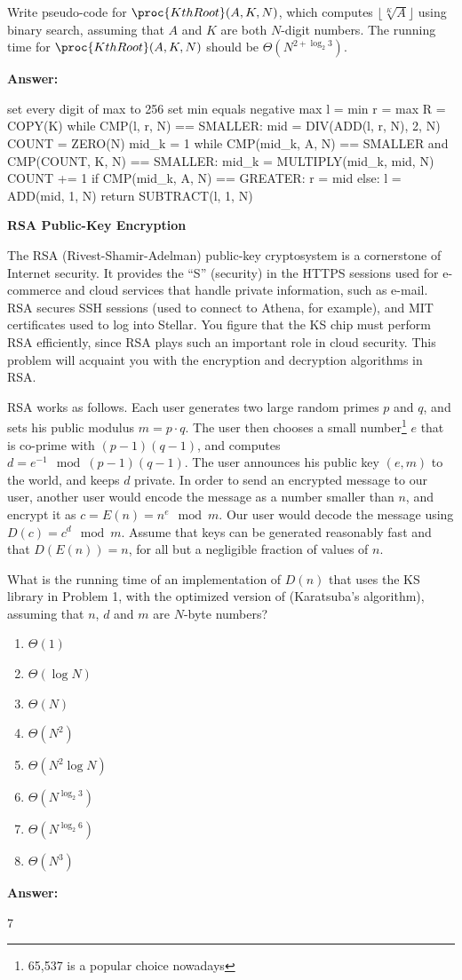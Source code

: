 \documentclass[12pt,twoside]{article}
\newcommand{\answer}{
 \par\medskip
 \textbf{Answer:}
}
\newcommand{\answerIp}{ \answer
set every digit of max to 256
set min equals negative max
l = min
r = max
R = COPY(K)
while CMP(l, r, N) == SMALLER:
  mid = DIV(ADD(l, r, N), 2, N)
  COUNT = ZERO(N)
  mid_k = 1
  while CMP(mid_k, A, N) == SMALLER and CMP(COUNT, K, N) == SMALLER:
    mid_k = MULTIPLY(mid_k, mid, N)
    COUNT += 1
  if CMP(mid_k, A, N) == GREATER:
    r = mid
  else:
    l = ADD(mid, 1, N)
return SUBTRACT(l, 1, N)
}
\newcommand{\answerIIa}{ \answer
7
}
\begin{document}
\begin{problems}
\begin{problemparts}
\problempart {} Write pseudo-code for $\proc{KthRoot}(A, K, N)$, which
computes $\lfloor \sqrt[K]{A} \rfloor$ using binary search, assuming that $A$
and $K$ are both $N$-digit numbers. The running time for $\proc{KthRoot}(A, K,
N)$ should be $\Theta(N^{2 + \log_2 3})$.

\answerIp

\end{problemparts}

\newpage

\problem {} \textbf{RSA Public-Key Encryption}

The RSA (Rivest-Shamir-Adelman) public-key cryptosystem is a cornerstone of
Internet security. It provides the ``S'' (security) in the HTTPS sessions used
for e-commerce and cloud services that handle private information, such as
e-mail. RSA secures SSH sessions (used to connect to Athena, for example), and
MIT certificates used to log into Stellar. You figure that the KS chip must
perform RSA efficiently, since RSA plays such an important role in cloud
security. This problem will acquaint you with the encryption and decryption
algorithms in RSA.

RSA works as follows. Each user generates two large random primes $p$ and $q$,
and sets his public modulus $m = p \cdot q$. The user then chooses a small
number\footnote{65,537 is a popular choice nowadays} $e$ that is co-prime with
$(p - 1)(q - 1)$, and computes $d = e^{-1} \mod (p - 1)(q - 1)$. The user
announces his public key $(e, m)$ to the world, and keeps $d$ private. In order
to send an encrypted message to our user, another user would encode the message
as a number smaller than $n$, and encrypt it as $c = E(n) = n^e \mod m$. Our
user would decode the message using $D(c) = c^d \mod m$. Assume that keys can be
generated reasonably fast and that $D(E(n)) = n$, for all but a negligible
fraction of values of $n$.

\begin{problemparts}
\problempart {} What is the running time of an implementation of $D(n)$
that uses the KS library in Problem 1, with the optimized version of
 (Karatsuba's algorithm), assuming that $n$, $d$ and $m$ are
$N$-byte numbers?
\begin{enumerate}
  \item $\Theta(1)$
  \item $\Theta(\log N)$
  \item $\Theta(N)$
  \item $\Theta(N^2)$
  \item $\Theta(N^2 \log N)$
  \item $\Theta(N^{\log_2 3})$
  \item $\Theta(N^{\log_2 6})$
  \item $\Theta(N^3)$
\end{enumerate}
\answerIIa


\end{problemparts}
\end{problems}
\end{document}
